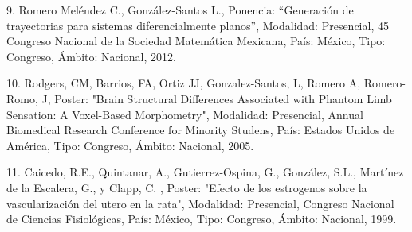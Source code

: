 9. Romero Meléndez C., González-Santos L., Ponencia: “Generación de trayectorias para sistemas 
diferencialmente planos”, Modalidad: Presencial, 45 Congreso Nacional de la Sociedad Matemática 
Mexicana, País: México, Tipo: Congreso, Ámbito: Nacional, 2012.

10. Rodgers, CM, Barrios, FA, Ortiz JJ, Gonzalez-Santos, L, Romero A, Romero-Romo, J, Poster: "Brain 
Structural Differences Associated with Phantom Limb Sensation: A Voxel-Based Morphometry", 
Modalidad: Presencial, Annual Biomedical Research Conference for Minority Studens, País: Estados 
Unidos de América, Tipo: Congreso, Ámbito: Nacional, 2005.

11. Caicedo, R.E., Quintanar, A., Gutierrez-Ospina, G., González, S.L., Martínez de la Escalera, G., 
y Clapp, C. , Poster: "Efecto de los estrogenos sobre la vascularización del utero en la rata", 
Modalidad: Presencial, Congreso Nacional de Ciencias Fisiológicas, País: México, Tipo: Congreso, 
Ámbito: Nacional, 1999.


